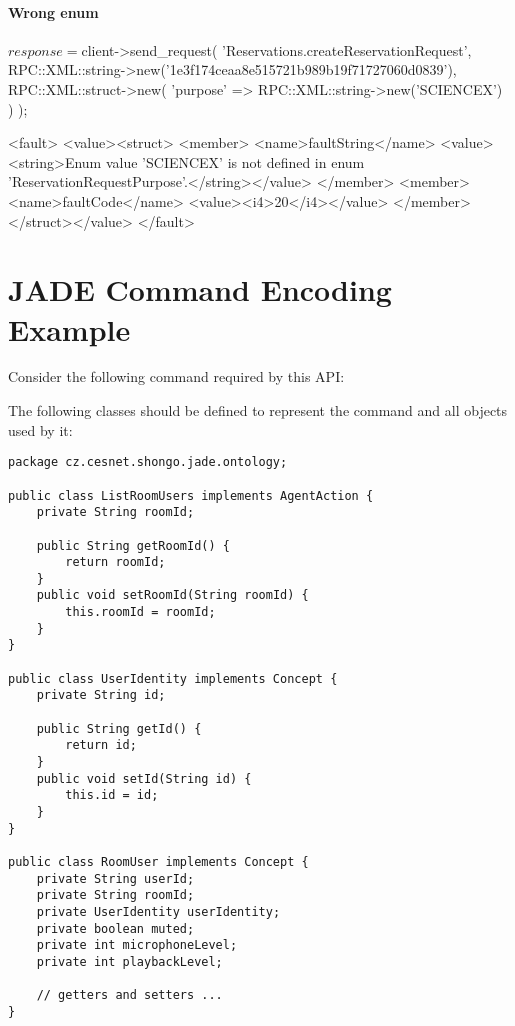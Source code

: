 \subsubsection{Wrong enum}
\begin{PerlCmd}
$response = $client->send_request(
    'Reservations.createReservationRequest',
    RPC::XML::string->new('1e3f174ceaa8e515721b989b19f71727060d0839'),
    RPC::XML::struct->new(
        'purpose' => RPC::XML::string->new('SCIENCEX')
    )
);
\end{PerlCmd}
\begin{PerlResponse}
<fault>
  <value><struct>
    <member>
      <name>faultString</name>
      <value><string>Enum value 'SCIENCEX' is not defined in enum
          'ReservationRequestPurpose'.</string></value>
    </member>
    <member>
      <name>faultCode</name>
      <value><i4>20</i4></value>
    </member>
  </struct></value>
</fault>
\end{PerlResponse}

\chapter{JADE Command Encoding Example} \label{appendix:jade-command-encoding}

Consider the following command required by this API:
\begin{Api}
\end{Api}
The following classes should be defined to represent the command and all objects used by it:
\begin{verbatim}
package cz.cesnet.shongo.jade.ontology;

public class ListRoomUsers implements AgentAction {
    private String roomId;

    public String getRoomId() {
        return roomId;
    }
    public void setRoomId(String roomId) {
        this.roomId = roomId;
    }
}

public class UserIdentity implements Concept {
    private String id;

    public String getId() {
        return id;
    }
    public void setId(String id) {
        this.id = id;
    }
}

public class RoomUser implements Concept {
    private String userId;
    private String roomId;
    private UserIdentity userIdentity;
    private boolean muted;
    private int microphoneLevel;
    private int playbackLevel;

    // getters and setters ...
}
\end{verbatim}

